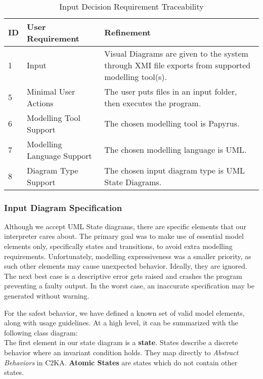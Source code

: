 \documentclass[11pt]{article}
\begin{document}
    \begin{table}[htbp]
    \centering
    \caption{Input Decision Requirement Traceability}\label{tab:input-table}\\
    \begin{tabularx}{\textwidth}{| l | l | X |}
        \hline
        \textbf{ID} & \textbf{User Requirement} & \textbf{Refinement} \\
        \hline
        1 & Input & Visual Diagrams are given to the system through XMI file exports from supported modelling tool(s). \\ \hline
        5 & Minimal User Actions & The user puts files in an input folder, then executes the program.  \\ \hline
        6 & Modelling Tool Support & The chosen modelling tool is Papyrus. \\ \hline
        7 & Modelling Language Support & The chosen modelling language is UML. \\ \hline
        8 & Diagram Type Support & The chosen input diagram type is UML State Diagrams. \\ \hline
    \end{tabularx}
    \end{table}

    \newpage
    \subsubsection{Input Diagram Specification}\label{subsubsec:input-specification}
    Although we accept UML State diagrams, there are specific elements that our interpreter cares about.
    The primary goal was to make use of essential model elements only, specifically states and transitions,
    to avoid extra modelling requirements.
    Unfortunately, modelling expressiveness was a smaller priority, as such
    other elements may cause unexpected behavior.
    Ideally, they are ignored.
    The next best case is a descriptive error gets raised and crashes the program preventing a faulty output.
    In the worst case, an inaccurate specification may be generated without warning.

    For the safest behavior, we have defined a known set of valid model elements, along with usage guidelines.
    At a high level, it can be summarized with the following class diagram:
    \\

    The first element in our state diagram is a \textbf{state}.
    States describe a discrete behavior where an invariant condition holds.
    They map directly to \textit{Abstract Behaviors} in C2KA\@.
    \textbf{Atomic States} are states which do not contain other states.
\end{document}
